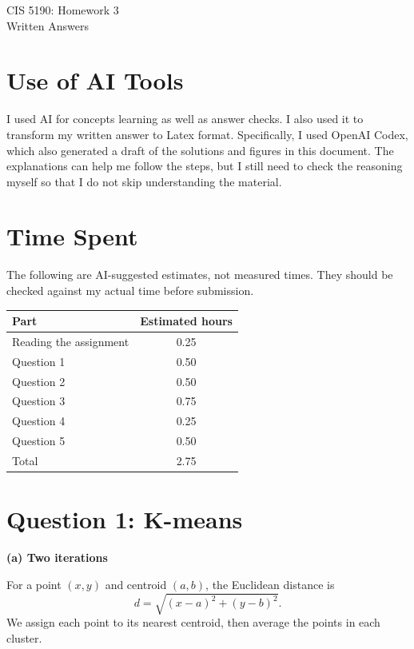 \documentclass[11pt]{article}
\newcommand{\parttitle}[1]{\par\textbf{#1}\par}
\begin{document}
\begin{center}
{\LARGE CIS 5190: Homework 3}\\[5pt]
{\large Written Answers}
\end{center}

\section*{Use of AI Tools}
I used AI for concepts learning as well as answer checks. I also used it to transform my written answer to Latex format.
Specifically, I used OpenAI Codex, which also generated a draft of the solutions and figures in this document.
The explanations can help me follow the steps, but I still need to check the reasoning myself so that I do not skip understanding the material.

\section*{Time Spent}
The following are AI-suggested estimates, not measured times. They should be checked against my actual time before submission.
\begin{center}
\begin{tabular}{lc}
\toprule
Part & Estimated hours \\
\midrule
Reading the assignment & 0.25 \\
Question 1 & 0.50 \\
Question 2 & 0.50 \\
Question 3 & 0.75 \\
Question 4 & 0.25 \\
Question 5 & 0.50 \\
\midrule
Total & 2.75 \\
\bottomrule
\end{tabular}
\end{center}

\newpage
\section*{Question 1: K-means}
\parttitle{(a) Two iterations}
For a point $(x,y)$ and centroid $(a,b)$, the Euclidean distance is
\[
 d=\sqrt{(x-a)^2+(y-b)^2}.
\]
We assign each point to its nearest centroid, then average the points in each cluster.
\end{document}
